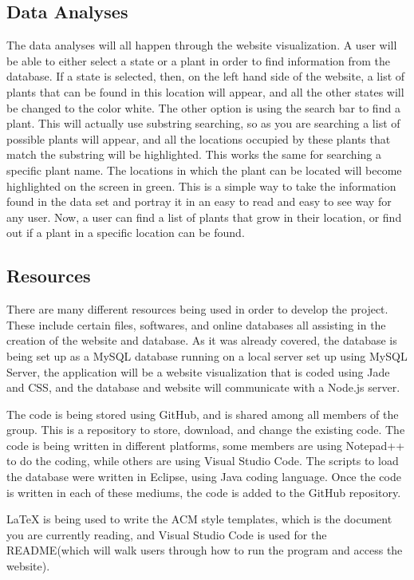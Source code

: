 \documentclass{Group6_Phase2}
\begin{document}
\subsection{Data Analyses}
The data analyses will all happen through the website visualization. A user will be able to either select a state or a plant in order to find information from the database. If a state is selected, then, on the left hand side of the website, a list of plants that can be found in this location will appear, and all the other states will be changed to the color white. The other option is using the search bar to find a plant. This will actually use substring searching, so as you are searching a list of possible plants will appear, and all the locations occupied by these plants that match the substring will be highlighted. This works the same for searching a specific plant name. The locations in which the plant can be located will become highlighted on the screen in green. This is a simple way to take the information found in the data set and portray it in an easy to read and easy to see way for any user. Now, a user can find a list of plants that grow in their location, or find out if a plant in a specific location can be found.

\subsection{Resources}
There are many different resources being used in order to develop the project. These include certain files, softwares, and online databases all assisting in the creation of the website and database. As it was already covered, the database is being set up as a MySQL database running on a local server set up using MySQL Server, the application will be a website visualization that is coded using Jade and CSS, and the database and website will communicate with a Node.js server. 

The code is being stored using GitHub, and is shared among all members of the group. This is a repository to store, download, and change the existing code. The code is being written in different platforms, some members are using Notepad++ to do the coding, while others are using Visual Studio Code. The scripts to load the database were written in Eclipse, using Java coding language. Once the code is written in each of these mediums, the code is added to the GitHub repository. 

LaTeX is being used to write the ACM style templates, which is the document you are currently reading, and Visual Studio Code is used for the README(which will walk users through how to run the program and access the website).
\end{document}

